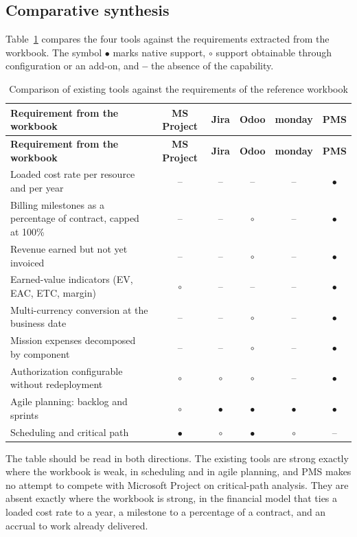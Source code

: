 \subsection{Comparative synthesis}
Table~\ref{tab:market-comparison} compares the four tools against the requirements extracted from
the workbook. The symbol $\bullet$ marks native support, $\circ$ support obtainable through
configuration or an add-on, and \textbf{--} the absence of the capability.

\begin{longtable}{|m{5.4cm}|c|c|c|c|c|}
\caption{Comparison of existing tools against the requirements of the reference workbook}\label{tab:market-comparison}\\
\hline
\textbf{Requirement from the workbook} & \textbf{MS Project} & \textbf{Jira} & \textbf{Odoo} &
\textbf{monday} & \textbf{PMS} \\
\hline
\endfirsthead
\hline
\textbf{Requirement from the workbook} & \textbf{MS Project} & \textbf{Jira} & \textbf{Odoo} &
\textbf{monday} & \textbf{PMS} \\
\hline
\endhead
\endfoot
\endlastfoot
\hline
Loaded cost rate per resource and per year & -- & -- & -- & -- & $\bullet$ \\
\hline
Billing milestones as a percentage of contract, capped at 100\% & -- & -- & $\circ$ & -- &
$\bullet$ \\
\hline
Revenue earned but not yet invoiced & -- & -- & $\circ$ & -- & $\bullet$ \\
\hline
Earned-value indicators (EV, EAC, ETC, margin) & $\circ$ & -- & -- & -- & $\bullet$ \\
\hline
Multi-currency conversion at the business date & -- & -- & $\circ$ & -- & $\bullet$ \\
\hline
Mission expenses decomposed by component & -- & -- & $\circ$ & -- & $\bullet$ \\
\hline
Authorization configurable without redeployment & $\circ$ & $\circ$ & $\circ$ & -- & $\bullet$ \\
\hline
Agile planning: backlog and sprints & $\circ$ & $\bullet$ & $\bullet$ & $\bullet$ & $\bullet$ \\
\hline
Scheduling and critical path & $\bullet$ & $\circ$ & $\bullet$ & $\circ$ & -- \\
\hline
\end{longtable}

The table should be read in both directions. The existing tools are strong exactly where the
workbook is weak, in scheduling and in agile planning, and PMS makes no attempt to compete with
Microsoft Project on critical-path analysis. They are absent exactly where the workbook is strong,
in the financial model that ties a loaded cost rate to a year, a milestone to a percentage of a
contract, and an accrual to work already delivered.

